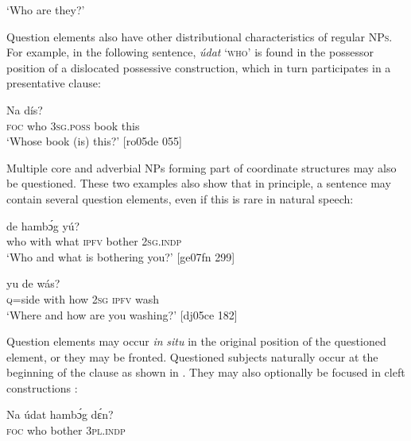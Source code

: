 \glt ‘Who are they?’
\z

Question elements also have other distributional characteristics of regular \textsc{NPs}. For example, in the following sentence, \textit{údat} ‘\textsc{who’} is found in the possessor position of a dislocated possessive construction, which in turn participates in a presentative clause: 


\ea%
    \label{ex:key:588}
    \gll Na            dís?\\
\textsc{foc}  who    \textsc{3sg.poss}  book  this\\

\glt ‘Whose book (is) this?’ [ro05de 055]
\z

Multiple core  and adverbial  \textsc{NP}s forming part of coordinate structures may also be questioned. These two examples also show that in principle, a sentence may contain several question elements, even if this is rare in natural speech:


\ea%
    \label{ex:key:589}
    \gll {}        de  hambɔ́g  yú?\\
who    with    what  \textsc{ipfv}  bother  \textsc{2sg.indp}\\

\glt ‘Who and what is bothering you?’ [ge07fn 299]
\z


\ea%
    \label{ex:key:590}
    \gll {}          yu  de  wás?\\
\textsc{q}=side  with    how    \textsc{2sg}  \textsc{ipfv}  wash\\

\glt ‘Where and how are you washing?’ [dj05ce 182]
\z

Question elements may occur \textit{in} \textit{situ} in the original position of the questioned element, or they may be fronted. Questioned subjects naturally occur at the beginning of the clause as shown in . They may also optionally be focused in cleft constructions : 


\ea%
    \label{ex:key:591}
    \gll Na  údat  hambɔ́g  dɛ́n?\\
\textsc{foc}  who    bother  \textsc{3pl.indp}\\


